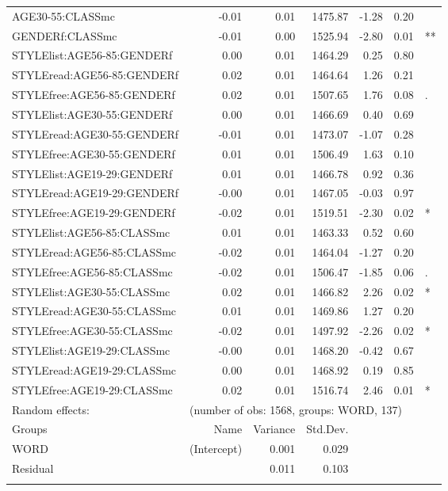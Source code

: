 {\begin{longtable}[c]{p{}rrrrrl}
		AGE30-55:CLASSmc & -0.01 & 0.01 & 1475.87 & -1.28 & 0.20 & \\ 
		GENDERf:CLASSmc & -0.01 & 0.00 & 1525.94 & -2.80 & 0.01 & **\\ 
		STYLElist:AGE56-85:GENDERf & 0.00 & 0.01 & 1464.29 & 0.25 & 0.80 & \\ 
		STYLEread:AGE56-85:GENDERf & 0.02 & 0.01 & 1464.64 & 1.26 & 0.21 & \\ 
		STYLEfree:AGE56-85:GENDERf & 0.02 & 0.01 & 1507.65 & 1.76 & 0.08 & .\\ 
		STYLElist:AGE30-55:GENDERf & 0.00 & 0.01 & 1466.69 & 0.40 & 0.69 & \\ 
		STYLEread:AGE30-55:GENDERf & -0.01 & 0.01 & 1473.07 & -1.07 & 0.28 & \\ 
		STYLEfree:AGE30-55:GENDERf & 0.01 & 0.01 & 1506.49 & 1.63 & 0.10 & \\ 
		STYLElist:AGE19-29:GENDERf & 0.01 & 0.01 & 1466.78 & 0.92 & 0.36 & \\ 
		STYLEread:AGE19-29:GENDERf & -0.00 & 0.01 & 1467.05 & -0.03 & 0.97 & \\ 
		STYLEfree:AGE19-29:GENDERf & -0.02 & 0.01 & 1519.51 & -2.30 & 0.02 & *\\ 
		STYLElist:AGE56-85:CLASSmc & 0.01 & 0.01 & 1463.33 & 0.52 & 0.60 & \\ 
		STYLEread:AGE56-85:CLASSmc & -0.02 & 0.01 & 1464.04 & -1.27 & 0.20 & \\ 
		STYLEfree:AGE56-85:CLASSmc & -0.02 & 0.01 & 1506.47 & -1.85 & 0.06 & .\\ 
		STYLElist:AGE30-55:CLASSmc & 0.02 & 0.01 & 1466.82 & 2.26 & 0.02 & * \\ 
		STYLEread:AGE30-55:CLASSmc & 0.01 & 0.01 & 1469.86 & 1.27 & 0.20 & \\ 
		STYLEfree:AGE30-55:CLASSmc & -0.02 & 0.01 & 1497.92 & -2.26 & 0.02 & * \\ 
		STYLElist:AGE19-29:CLASSmc & -0.00 & 0.01 & 1468.20 & -0.42 & 0.67 & \\ 
		STYLEread:AGE19-29:CLASSmc & 0.00 & 0.01 & 1468.92 & 0.19 & 0.85 & \\ 
		STYLEfree:AGE19-29:CLASSmc & 0.02 & 0.01 & 1516.74 & 2.46 & 0.01 & * \\ 
		\midrule 
		Random effects: & \multicolumn{6}{l}{(number of obs: 1568, groups: WORD, 137)} \\
		Groups &         Name & Variance &      Std.Dev. & & & \\
		WORD &  (Intercept) & 0.001 & 0.029 & & & \\
		Residual  &         & 0.011 & 0.103 & & & \\
		\lspbottomrule
	\end{longtable}
}


